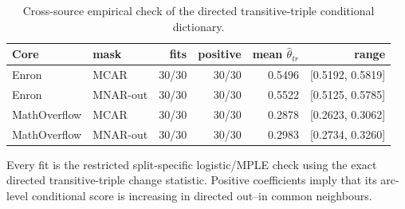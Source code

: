 \begin{table}[tbp]
\centering
\small
\caption{Cross-source empirical check of the directed transitive-triple conditional dictionary.}
\label{tab:scope-mtt}
\begin{tabular}{llrrrr}
\toprule
Core & mask & fits & positive & mean $\hat\theta_{tr}$ & range \\
\midrule
Enron & MCAR & 30/30 & 30/30 & 0.5496 & [0.5192, 0.5819] \\
Enron & MNAR-out & 30/30 & 30/30 & 0.5522 & [0.5125, 0.5785] \\
MathOverflow & MCAR & 30/30 & 30/30 & 0.2878 & [0.2623, 0.3062] \\
MathOverflow & MNAR-out & 30/30 & 30/30 & 0.2983 & [0.2734, 0.3260] \\
\bottomrule
\end{tabular}
\par\vspace{2pt}\footnotesize Every fit is the restricted split-specific logistic/MPLE check using the exact directed transitive-triple change statistic. Positive coefficients imply that its arc-level conditional score is increasing in directed out--in common neighbours.
\end{table}
